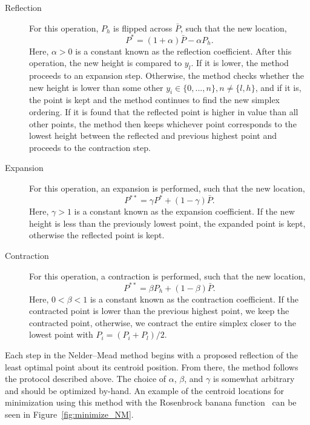 \begin{description}

\item[Reflection] For this operation, $P_h$ is flipped across $\bar P$, such that the new location,
\begin{equation}
P^* = (1+\alpha)\bar P - \alpha P_h.
\end{equation}
\noindent Here, $\alpha > 0$ is a constant known as the reflection coefficient.
After this operation, the new height is compared to $y_l$.
If it is lower, the method proceeds to an expansion step.
Otherwise, the method checks whether the new height is lower than some other $y_i \in \{0,...,n\},n\neq \{l,h\}$, and if it is, the point is kept and the method continues to find the new simplex ordering.
If it is found that the reflected point is higher in value than all other points, the method then keeps whichever point corresponds to the lowest height between the reflected and previous highest point and proceeds to the contraction step.

\item[Expansion] For this operation, an expansion is performed, such that the new location,
\begin{equation}
P^{**} = \gamma P^* + (1-\gamma)\bar P.
\end{equation}
\noindent Here, $\gamma > 1$ is a constant known as the expansion coefficient.
If the new height is less than the previously lowest point, the expanded point is kept, otherwise the reflected point is kept.

\item[Contraction] For this operation, a contraction is performed, such that the new location,
\begin{equation}
P^{**} = \beta P_h + (1-\beta)\bar P.
\end{equation}
\noindent Here, $0 < \beta < 1$ is a constant known as the contraction coefficient.
If the contracted point is lower than the previous highest point, we keep the contracted point, otherwise, we contract the entire simplex closer to the lowest point with $P_i = (P_i + P_l)/2$.
\end{description}

Each step in the Nelder--Mead method begins with a proposed reflection of the least optimal point about its centroid position.
From there, the method follows the protocol described above.
The choice of $\alpha$, $\beta$, and $\gamma$ is somewhat arbitrary and should be optimized by-hand.
An example of the centroid locations for minimization using this method with the Rosenbrock banana function~\cite{pohlheim2007} can be seen in Figure~\ref{fig:minimize_NM}.

